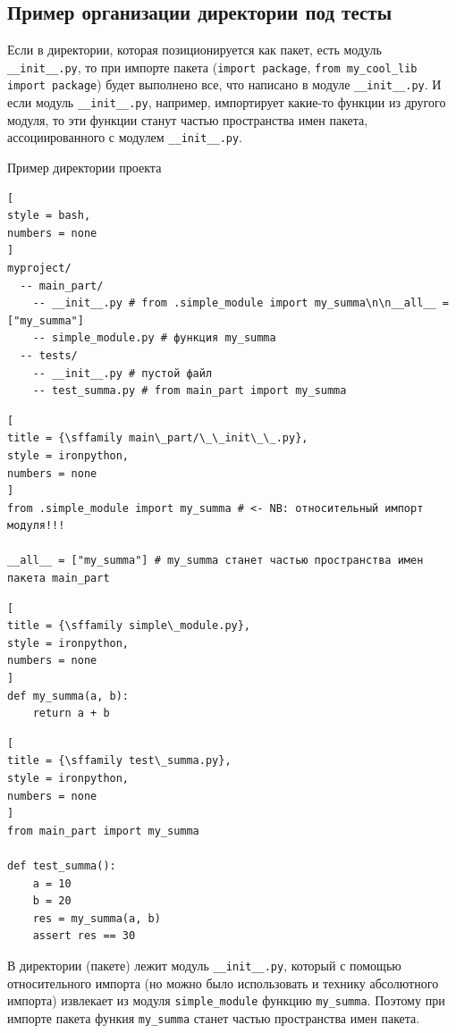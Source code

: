 \documentclass[%
	11pt,
	a4paper,
	utf8,
		]{article}
\begin{document}
\subsection{Пример организации директории под тесты}

Если в директории, которая позиционируется как пакет, есть модуль \texttt{\_\_init\_\_.py}, то при импорте пакета (\texttt{import package}, \texttt{from my\_cool\_lib import package}) будет выполнено все, что написано в модуле  \texttt{\_\_init\_\_.py}. И если модуль \texttt{\_\_init\_\_.py}, например, импортирует какие-то функции из другого модуля, то эти функции станут частью пространства имен пакета, ассоциированного с модулем \texttt{\_\_init\_\_.py}.

Пример директории проекта
\begin{lstlisting}[
style = bash,
numbers = none	
]
myproject/
  -- main_part/
    -- __init__.py # from .simple_module import my_summa\n\n__all__ = ["my_summa"]
    -- simple_module.py # функция my_summa
  -- tests/
    -- __init__.py # пустой файл
    -- test_summa.py # from main_part import my_summa
\end{lstlisting}

\begin{lstlisting}[
title = {\sffamily main\_part/\_\_init\_\_.py},
style = ironpython,
numbers = none	
]
from .simple_module import my_summa # <- NB: относительный импорт модуля!!!

__all__ = ["my_summa"] # my_summa станет частью пространства имен пакета main_part
\end{lstlisting}

\begin{lstlisting}[
title = {\sffamily simple\_module.py},
style = ironpython,
numbers = none	
]
def my_summa(a, b):
    return a + b
\end{lstlisting}

\begin{lstlisting}[
title = {\sffamily test\_summa.py},
style = ironpython,
numbers = none	
]
from main_part import my_summa

def test_summa():
    a = 10
    b = 20
    res = my_summa(a, b)
    assert res == 30
\end{lstlisting}

В директории (пакете)  лежит модуль \verb|__init__.py|, который с помощью относительного импорта (но можно было использовать и технику абсолютного импорта) извлекает из модуля \texttt{simple\_module} функцию \texttt{my\_summa}. Поэтому при импорте пакета  функия \texttt{my\_summa} станет частью пространства имен пакета.
\end{document}
